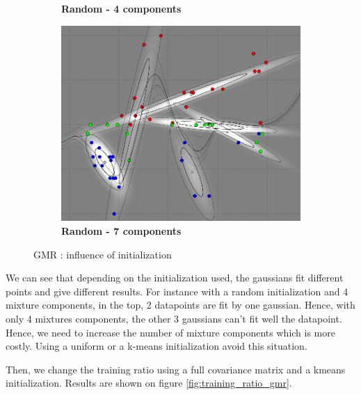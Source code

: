 \begin{figure}[!ht]
\begin{subfigure}[h]{0.3\textwidth}
\caption{\bf Random - 4 components}
\end{subfigure}
\begin{subfigure}[h]{0.3\textwidth}
\centering
\includegraphics[height=0.11\textheight]{./regression/full_cov_random_7_mixture_100train.png}
\caption{\bf Random - 7 components}
\end{subfigure}
\caption{GMR : influence of initialization}
\label{fig:initialization_gmr}
\end{figure}

We can see that depending on the initialization used, the gaussians fit different points and give different results. For instance with a random initialization and 4 mixture components, in the top, 2 datapoints are fit by one gaussian. Hence, with only 4 mixtures components, the other 3 gaussians can't fit well the datapoint. Hence, we need to increase the number of mixture components which is more costly. Using a uniform or a k-means initialization avoid this situation. 

Then, we change the training ratio using a full covariance matrix and a kmeans initialization. Results are shown on figure \ref{fig:training_ratio_gmr}.


